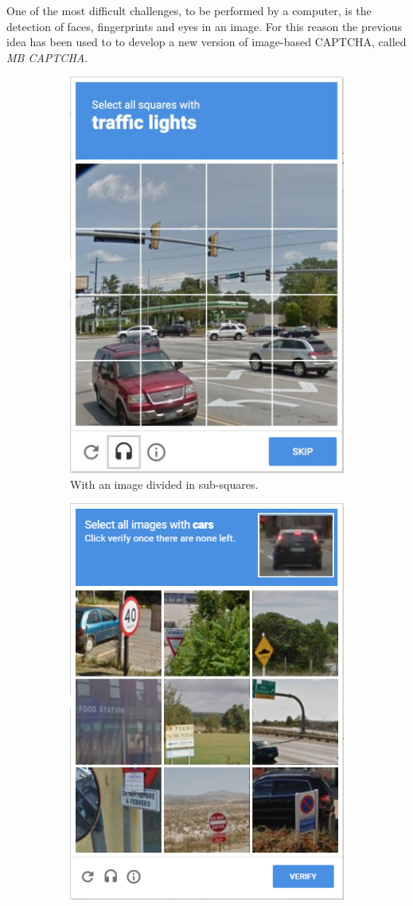 \begin{itemize}
{One of the most difficult challenges, to be performed by a computer, is the detection of faces, fingerprints and eyes in an image. For this reason the previous idea has been used to to develop a new version of image-based CAPTCHA, called \textit{MB CAPTCHA}\cite{MB_CAPTCHA}.
\begin{figure}[h]
     \centering
     \begin{subfigure}[b]{0.48\textwidth}
         \centering
         \includegraphics[width=.68\linewidth]{Images/StateOfArt/selection_CAPTCHA}
         \caption{\footnotesize{With an image divided in sub-squares.}}
         \label{soa:selection}
     \end{subfigure}
     \hfill
     \begin{subfigure}[b]{0.48\textwidth}
         \centering
         \includegraphics[width=.68\linewidth]{Images/StateOfArt/selection_CAPTCHA2}

\end{subfigure}
\end{figure}}
\end{itemize}
